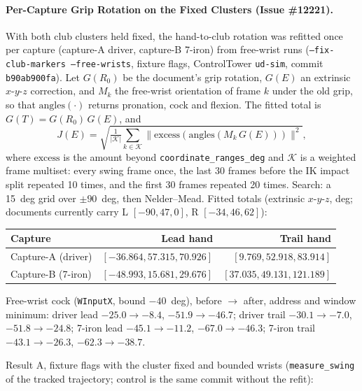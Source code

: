 \documentclass[11pt,a4paper]{article}
\begin{document}
\paragraph{Per-Capture Grip Rotation on the Fixed Clusters (Issue \#12221).}
With both club clusters held fixed, the hand-to-club rotation was refitted once per
capture (capture-A driver, capture-B 7-iron) from free-wrist runs
(\texttt{--fix-club-markers --free-wrists}, fixture flags, ControlTower
\texttt{ud-sim}, commit \texttt{b90ab900fa}). Let $G(R_0)$ be the document's grip rotation, $G(E)$ an extrinsic
$x$-$y$-$z$ correction, and $M_k$ the free-wrist orientation of frame $k$ under
the old grip, so that $\mathrm{angles}(\cdot)$ returns pronation, cock and flexion. The
fitted total is $G(T)=G(R_0)\,G(E)$, and
\[
J(E)=\sqrt{\tfrac{1}{|\mathcal K|}\textstyle\sum_{k\in\mathcal K}
\lVert \mathrm{excess}(\mathrm{angles}(M_k\,G(E)))\rVert^{2}},
\]
where $\mathrm{excess}$ is the amount beyond \texttt{coordinate\_ranges\_deg} and
$\mathcal K$ is a weighted frame multiset: every swing frame once, the last 30
frames before the IK impact split repeated 10 times, and the first 30 frames
repeated 20 times. Search: a 15~deg grid over $\pm 90$~deg, then Nelder--Mead.
Fitted totals (extrinsic $x$-$y$-$z$, deg; documents currently carry L
$[-90, 47, 0]$, R $[-34, 46, 62]$):

\begin{center}
\begin{tabular}{lrr}
\hline
Capture & Lead hand & Trail hand \\
\hline
Capture-A (driver) & $[-36.864, 57.315, 70.926]$ & $[9.769, 52.918, 83.914]$ \\
Capture-B (7-iron) & $[-48.993, 15.681, 29.676]$ & $[37.035, 49.131, 121.189]$ \\
\hline
\end{tabular}
\end{center}
Free-wrist cock (\texttt{WInputX}, bound $-40$~deg), before $\to$ after, address
and window minimum: driver lead $-25.0 \to -8.4$, $-51.9 \to -46.7$; driver trail
$-30.1 \to -7.0$, $-51.8 \to -24.8$; 7-iron lead $-45.1 \to -11.2$,
$-67.0 \to -46.3$; 7-iron trail $-43.1 \to -26.3$, $-62.3 \to -38.7$.

Result A, fixture flags with the cluster fixed and bounded wrists
(\texttt{measure\_swing} of the tracked trajectory; control is the same commit
without the refit):
\end{document}
